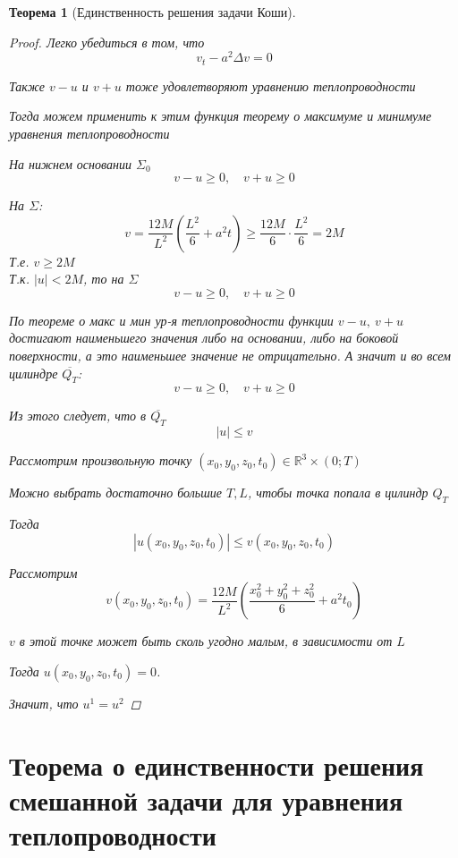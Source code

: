 \documentclass[a4paper]{article}
\newtheorem*{theorem}{Теорема}
\theoremstyle{definition}
\theoremstyle{remark}
\begin{document}
\begin{tcolorbox}[title=Теорема о единственности решения задачи Коши,%
    enhanced,breakable,skin first=enhanced,skin middle=enhanced,skin last=enhanced]
\begin{theorem}[Единственность решения задачи Коши]
\begin{proof}
        Легко убедиться в том, что
        \[
            v_t - a^2 \Delta v = 0
        \]

        Также $ v - u $ и $ v+u $ тоже удовлетворяют уравнению теплопроводности

        Тогда можем применить к этим функция теорему о максимуме и минимуме
        уравнения теплопроводности

        На нижнем основании $ \Sigma_0 $
        \[
            v-u \geq 0, \quad v+u \geq 0
        \]

        На $ \Sigma $:
        \[
            v = \frac{12M}{L^2} \left(\frac{L^2}{6} + a^2 t \right) \geq 
            \frac{12M}{6} \cdot \frac{L^2}{6} = 2M
        \]
        Т.е. $ v \geq 2M $ \\
        Т.к. $ |u| < 2M $, то на $ \Sigma $ 
        \[
            v-u \geq 0, \quad v+u \geq 0
        \]

        По теореме о макс и мин ур-я теплопроводности функции $ v-u, \ v+u $ 
        достигают наименьшего значения либо на основании, либо на боковой
        поверхности, а это наименьшее значение не отрицательно. А значит
        и во всем цилиндре $ \overline{Q_T} $:
        \[
            v-u \geq 0, \quad v+u \geq 0
        \]

        Из этого следует, что в $ \overline{Q_T} $ 
        \[
            |u| \leq v
        \]

        Рассмотрим произвольную точку $ (x_0, y_0, z_0, t_0) \in \mathbb{R}^3
        \times (0;T)$ 

        Можно выбрать достаточно большие $ T, L $, чтобы точка попала в цилиндр
        $ Q_T $

        Тогда
        \[
            |u(x_0,y_0,z_0,t_0)| \leq v(x_0,y_0,z_0,t_0)
        \]

        Рассмотрим
        \[
            v(x_0,y_0,z_0,t_0) = \frac{12M}{L^2} 
            \left(\frac{x_0^2+y_0^2+z_0^2}{6} + a^2 t_0 \right)
        \]

        $ v $ в этой точке может быть сколь угодно малым, в зависимости от $ L $ 

        Тогда $ u(x_0, y_0,z_0,t_0) = 0 $.

        Значит, что $ u^{1} = u^2 $ 

    \end{proof}
\end{theorem}
\end{tcolorbox}

\section*{Теорема о единственности решения смешанной задачи для уравнения
теплопроводности}
\end{document}
